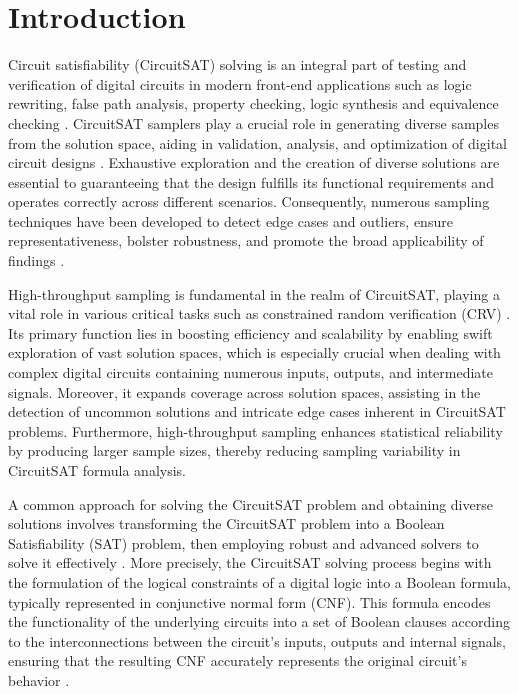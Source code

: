 \section{Introduction}
Circuit satisfiability (CircuitSAT) solving is an integral part of testing and verification of digital circuits in modern front-end applications such as logic rewriting, false path analysis, property checking, logic synthesis and equivalence checking \cite{Mishchenko2005Optimization, Tsai2009TimingAnalyzer, Bradley2011ModelChecking, Mishchenko2006EquivalenceChecking, Zhang2021LogicSynthesis}. CircuitSAT samplers play a crucial role in generating diverse samples from the solution space, aiding in validation, analysis, and optimization of digital circuit designs \cite{dutra2018quicksampler}. Exhaustive exploration and the creation of diverse solutions are essential to guaranteeing that the design fulfills its functional requirements and operates correctly across different scenarios. Consequently, numerous sampling techniques have been developed to detect edge cases and outliers, ensure representativeness, bolster robustness, and promote the broad applicability of findings \cite{dutra2019EfficientSampling}.

High-throughput sampling is fundamental in the realm of CircuitSAT, playing a vital role in various critical tasks such as constrained random verification (CRV) \cite{Kitchen2007crv}. Its primary function lies in boosting efficiency and scalability by enabling swift exploration of vast solution spaces, which is especially crucial when dealing with complex digital circuits containing numerous inputs, outputs, and intermediate signals. Moreover, it expands coverage across solution spaces, assisting in the detection of uncommon solutions and intricate edge cases inherent in CircuitSAT problems. Furthermore, high-throughput sampling enhances statistical reliability by producing larger sample sizes, thereby reducing sampling variability in CircuitSAT formula analysis.

A common approach for solving the CircuitSAT problem and obtaining diverse solutions involves transforming the CircuitSAT problem into a Boolean Satisfiability (SAT) problem, then employing robust and advanced solvers to solve it effectively \cite{Hsu2014CircuitSAT}. More precisely, the CircuitSAT solving process begins with the formulation of the logical constraints of a digital logic into a Boolean formula, typically represented in conjunctive normal form (CNF). This formula encodes the functionality of the underlying circuits into a set of Boolean clauses according to the interconnections between the circuit's inputs, outputs and internal signals, ensuring that the resulting CNF accurately represents the original circuit's behavior \cite{Velev2004CNF}. 

